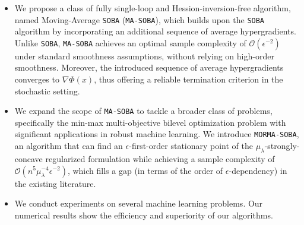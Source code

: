 \documentclass[10pt]{article}
\theoremstyle{remark}
\begin{document}
\begin{itemize}[leftmargin=2em]
    \item We propose a class of fully single-loop and Hession-inversion-free algorithm, named Moving-Average \texttt{SOBA} (\texttt{MA-SOBA}), which builds upon the \texttt{SOBA} algorithm by incorporating an additional sequence of average hypergradients. Unlike \texttt{SOBA}, \texttt{MA-SOBA} achieves an optimal sample complexity of $\mathcal{O}(\epsilon^{-2})$ under standard smoothness assumptions, without relying on high-order smoothness. Moreover, the introduced sequence of average hypergradients converges to $\nabla \Phi(x)$, thus offering a reliable termination criterion in the stochastic setting.
    \item We expand the scope of \texttt{MA-SOBA} to tackle a broader class of problems, specifically the min-max multi-objective bilevel optimization problem with significant applications in robust machine learning. We introduce \texttt{MORMA-SOBA}, an algorithm that can find an $\epsilon$-first-order stationary point of the $\mu_\lambda$-strongly-concave regularized formulation while achieving a sample complexity of $\mathcal{O}(n^5\mu_{\lambda}^{-4}\epsilon^{-2})$, which fills a gap (in terms of the order of $\epsilon$-dependency) in the existing literature.
    \item We conduct experiments on several machine learning problems. Our numerical results show the efficiency and superiority of our algorithms.
\end{itemize}
\end{document}
